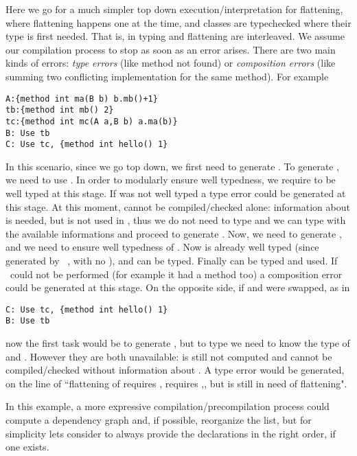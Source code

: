 Here we go for a much simpler top down execution/interpretation for flattening, where flattening
happens one at the time, and classes are typechecked where their type is first needed.
That is, in \name typing and flattening are interleaved. We assume our compilation process to stop as soon as 
an error arises. There are two main kinds of errors: \emph{type errors} (like method not found) or \emph{composition errors} (like summing two conflicting implementation for the same method).
For example
\saveSpace\begin{lstlisting}
A:{method int ma(B b) b.mb()+1}
tb:{method int mb() 2}
tc:{method int mc(A a,B b) a.ma(b)}
B: Use tb
C: Use tc, {method int hello() 1}
\end{lstlisting}\saveSpace
In this scenario, since we go top down, we first need to generate \Q@B@.
To generate \Q@B@, we need to use \Q@tb@.
In order to modularly ensure well typedness,
we require \Q@tb@ to be well typed at this stage. If \Q@tb@ was not well typed
a type error could be generated at this stage.
At this moment, \Q@A@ cannot be compiled/checked alone:
information about \Q@B@ is needed, but \Q@A@ is not used in \Q@tb@,
thus we do not need to type \Q@A@ and we can type \Q@tb@ with
 the available informations and proceed to generate \Q@B@.
Now, we need to generate \Q@C@, and we need to ensure well typedness of \Q@tc@.
Now \Q@B@ is already well typed (since generated by \use\ \Q@tb@, with no \mL),
and \Q@A@ can be typed. Finally \Q@tc@ can be typed and used.
If \use\ could not be performed (for example it \Q@tc@ had a method \Q@hello@ too)
a composition error could be generated at this stage.
On the opposite side, if \Q@B@ and \Q@C@ were swapped, as in
\saveSpace\begin{lstlisting}
C: Use tc, {method int hello() 1}  
B: Use tb
\end{lstlisting}\saveSpace
\noindent
now the first task would be to generate \Q@C@, but 
to type \Q@tc@ we need to know the type of \Q@A@ and \Q@B@.
However they are both unavailable: \Q@B@ is still not computed and 
\Q@A@ cannot be compiled/checked without information about \Q@B@.
A type error would be generated, on the line of ``flattening of \Q@C@
requires \Q@tc@, \Q@tc@ requires \Q@A@,\Q@B@, but \Q@B@ is still in need of flattening".

In this example, a more expressive compilation/precompilation process 
could compute a dependency graph and, if possible, reorganize the list,
but for simplicity lets consider to always provide the declarations
in the right order, if one exists.


